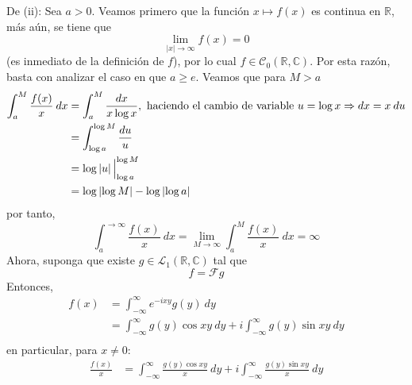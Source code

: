 \documentclass[12pt]{report}
\theoremstyle{largebreak}
\renewcommand{\geq}{\ensuremath{\geqslant}}
\newcommand\abs[1]{\ensuremath{\left|#1\right|}}
\newcommand{\fou}[1]{\ensuremath{\mathcal{F}#1}}
\begin{document}
\begin{sol}
        De (ii): Sea $a>0$. Veamos primero que la función $x\mapsto f(x)$ es continua en $\mathbb{R}$, más aún, se tiene que
        \begin{equation*}
            \lim_{ \abs{x}\rightarrow\infty}f(x)=0
        \end{equation*}
        (es inmediato de la definición de $f$), por lo cual $f\in\mathcal{C}_0(\mathbb{R},\mathbb{C})$. Por esta razón, basta con analizar el caso en que $a\geq e$. Veamos que para $M>a$
        \begin{equation*}
            \begin{split}
                \int_{a}^{M}\frac{f(x)}{x}\:dx&=\int_{ a}^{M}\frac{dx}{x\log x},\textup{ haciendo el cambio de variable }u=\log x\Rightarrow dx=x\:du \\
                &=\int_{\log a}^{ \log M}\frac{du}{u}\\
                &=\log\abs{u}\Big|_{\log a}^{\log M}\\
                &=\log\abs{\log M}-\log\abs{\log a}\\
            \end{split}
        \end{equation*}
        por tanto,
        \begin{equation*}
            \int_{a}^{\rightarrow\infty}\frac{f(x)}{x}\:dx=\lim_{M\rightarrow\infty}\int_{a}^M\frac{f(x)}{x}\:dx=\infty
        \end{equation*}
        Ahora, suponga que existe $g\in\mathcal{L}_1(\mathbb{R},\mathbb{C})$ tal que
        \begin{equation*}
            f=\fou{g}
        \end{equation*}
        Entonces,
        \begin{equation*}
            \begin{split}
                f(x)&=\int_{-\infty}^{\infty}e^{ -ixy}g(y)\:dy\\
                &=\int_{-\infty}^{\infty}g(y)\cos xy\:dy+i\int_{-\infty}^{\infty}g(y)\sin xy\:dy\\
            \end{split}
        \end{equation*}
        en particular, para $x\neq0$:
        \begin{equation*}
            \begin{split}
                \frac{f(x)}{x}&=\int_{-\infty}^{\infty}\frac{g(y)\cos xy}{x}\:dy+i\int_{-\infty}^{\infty}\frac{g(y)\sin xy}{x}\:dy\\

\end{split}
\end{equation*}
\end{sol}
\end{document}
